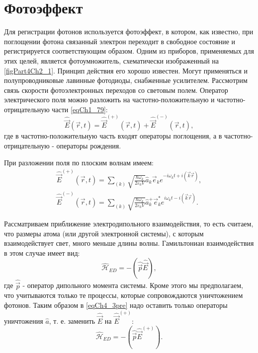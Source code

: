 \section{Фотоэффект}
Для регистрации фотонов используется фотоэффект, в котором, как
известно, при поглощении фотона связанный электрон переходит в
свободное состояние и регистрируется соответствующим
образом. Одним из приборов, применяемых для этих целей,
является фотоумножитель, схематически изображенный на
\autoref{figPart4Ch2_1}. Принцип действия его хорошо известен. Могут применяться
и полупроводниковые лавинные фотодиоды, снабженные
усилителем. Рассмотрим связь скорости фотоэлектронных
переходов со световым полем. Оператор электрического поля
можно разложить на частотно-положительную и
частотно-отрицательную части \eqref{eqCh1_79}: 
\begin{equation}
\hat{\vec{E}}\left(\vec{r}, t\right) = 
\hat{\vec{E}}^{(+)}\left(\vec{r}, t\right) +
\hat{\vec{E}}^{(-)}\left(\vec{r}, t\right),
\label{eqCh4_1}
\end{equation}
где в частотно-положительную часть входят операторы поглощения, а в
частотно-отрицательную - операторы рождения. 



При разложении поля по плоским волнам имеем:
\begin{eqnarray}
\hat{\vec{E}}^{(+)}\left(\vec{r}, t\right) = \sum_{(k)} \sqrt{\frac{\hbar \omega_k}{2 \varepsilon_0
V}} \hat{a}_k \vec{e}_k e^{-i \omega_k t + i \left(\vec{k}\vec{r}
  \right)},
\nonumber \\
\hat{\vec{E}}^{(-)}\left(\vec{r}, t\right) = \sum_{(k)} \sqrt{\frac{\hbar \omega_k}{2 \varepsilon_0
V}} \hat{a}_k^{+} \vec{e}_k^{*} e^{i \omega_k t - i \left(\vec{k}\vec{r}
  \right)}.
\label{eqCh4_2}
\end{eqnarray}

Рассматриваем приближение электродипольного взаимодействия, то есть
считаем, что размеры атома (или другой электронной системы), с
которым взаимодействует свет, много меньше длины
волны. Гамильтониан взаимодействия в этом случае имеет вид: 
\begin{equation}
\hat{\mathcal{H}}_{ED} = - \left(\hat{\vec{p}}\hat{\vec{E}}\right),
\label{eqCh4_3pre}
\end{equation}
где $\hat{\vec{p}}$ - оператор дипольного момента системы. 
Кроме этого мы предполагаем, что учитываются только те процессы,
которые сопровождаются уничтожением фотонов. Таким образом в
\eqref{eqCh4_3pre} надо оставить только операторы уничтожения
$\hat{a}$, т. е. заменить $\hat{\vec{E}}$ на $\hat{\vec{E}}^{(+)}$:
\begin{equation}
\hat{\mathcal{H}}_{ED} = - \left(\hat{\vec{p}}\hat{\vec{E}}^{(+)}\right).
\label{eqCh4_3}
\end{equation}

